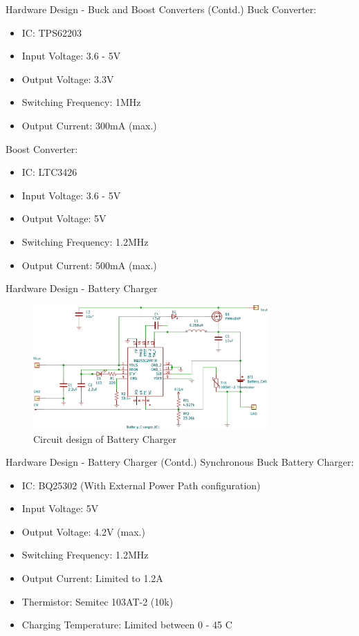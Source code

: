 \documentclass[aspectratio=169]{beamer}
\begin{document}
\begin{frame}{Hardware Design - Buck and Boost Converters (Contd.)}
	Buck Converter:
	\begin{itemize}
		\item IC: TPS62203
		\item Input Voltage: 3.6 - 5V
		\item Output Voltage: 3.3V
		\item Switching Frequency: 1MHz
		\item Output Current: 300mA (max.)
		\end{itemize}
		Boost Converter:
			\begin{itemize}
			\item IC: LTC3426
			\item Input Voltage: 3.6 - 5V
			\item Output Voltage: 5V
			\item Switching Frequency: 1.2MHz
			\item Output Current: 500mA (max.)
		\end{itemize}
	\end{frame}

		\begin{frame}{Hardware Design - Battery Charger }
	\begin{figure}[h]
		\centering
		\includegraphics[width=0.8\textwidth]{diag/charg2.pdf}
		\caption{Circuit design of Battery Charger}
		\label{fig:mesh1}
	\end{figure}
\end{frame}


\begin{frame}{Hardware Design - Battery Charger (Contd.)}
	Synchronous Buck Battery Charger:
	\begin{itemize}
		\item IC: BQ25302 (With External Power Path configuration)
		\item Input Voltage: 5V
		\item Output Voltage: 4.2V (max.)
		\item Switching Frequency: 1.2MHz
		\item Output Current: Limited to 1.2A
		\item Thermistor: Semitec 103AT-2 (10k\ohm)
		\item Charging Temperature: Limited between 0 - 45 C
				\end{itemize}
	\end{frame}
\end{document}
